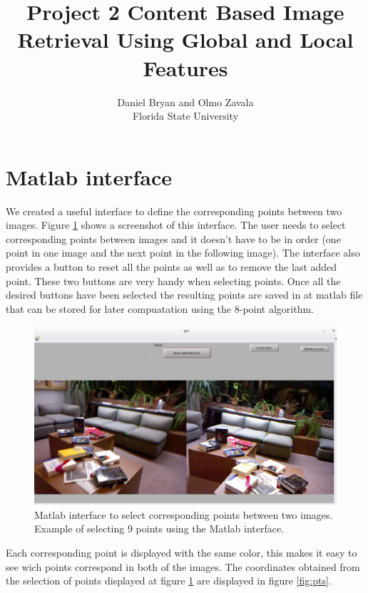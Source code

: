 \documentclass[a4paper,12pt]{article}
\title{Project 2 Content Based Image Retrieval Using Global and Local Features}
\author{Daniel Bryan and Olmo Zavala\\Florida State University}
\begin{document}
\maketitle

\section{Matlab interface}
We created a useful interface to define the corresponding points between two images.
Figure \ref{fig:demo} shows a screenshot of this interface. The user needs to select
corresponding points between images and it doesn't have to be in order (one point in one
image and the next point in the following image). The interface also provides a button to
reset all the points as well as to remove the last added point. These two buttons are
very handy when selecting points. Once all the desired buttons have been selected the 
resulting points are saved in at matlab file that can be stored for later compuatation
using the 8-point algorithm. 

\begin{figure}[h]
    \centering
    \includegraphics[totalheight=.38\textheight]{./images/Example.jpg}
    \caption{Matlab interface to select corresponding points between two images.
    Example of selecting 9 points using the Matlab interface.}
    \label{fig:demo}
\end{figure}

Each corresponding point is displayed with the same color, 
this makes it easy to see wich points correspond in both of the images.
The coordinates obtained from the selection of points displayed at figure \ref{fig:demo} 
are displayed in figure \ref{fig:pts}.
\end{document}
